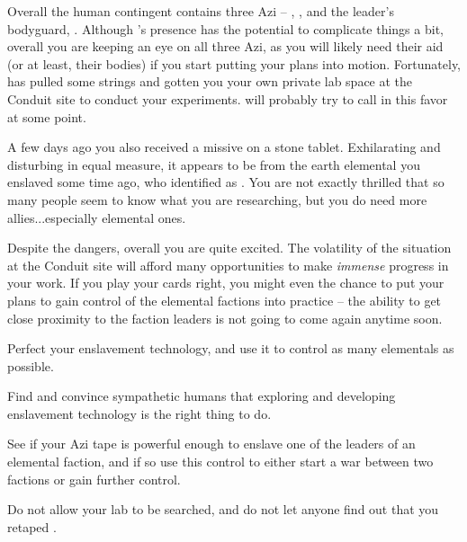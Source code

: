 \documentclass[char]{elementals}
\begin{document}
Overall the human contingent contains three Azi -- \cDiplomat{}, \cScientist{}, and the leader's bodyguard, \cRomeo{\intro}. Although \cDiplomat{}'s presence has the potential to complicate things a bit, overall you are keeping an eye on all three Azi, as you will likely need their aid (or at least, their bodies) if you start putting your plans into motion. Fortunately, \cDema{} has pulled some strings and gotten you your own private lab space at the Conduit site to conduct your experiments. \cDema{\They} will probably try to call in this favor at some point.

A few days ago you also received a missive on a stone tablet. Exhilarating and disturbing in equal measure, it appears to be from the earth elemental you enslaved some time ago, who identified \cMinion{\themself} as \cMinion{\intro}. You are not exactly thrilled that so many people seem to know what you are researching, but you do need more allies...especially elemental ones.

Despite the dangers, overall you are quite excited. The volatility of the situation at the Conduit site will afford many opportunities to make \emph{immense} progress in your work. If you play your cards right, you might even the chance to put your plans to gain control of the elemental factions into practice -- the ability to get close proximity to the faction leaders is not going to come again anytime soon.

\begin{itemz}[Goals]
  \item Perfect your enslavement technology, and use it to control as many elementals as possible.
  \item Find and convince sympathetic humans that exploring and developing enslavement technology is the right thing to do.
  \item See if your Azi tape is powerful enough to enslave one of the leaders of an elemental faction, and if so use this control to either start a war between two factions or gain further control.
  \item Do not allow your lab to be searched, and do not let anyone find out that you retaped \cDiplomat{}.
\end{itemz}
\end{document}
